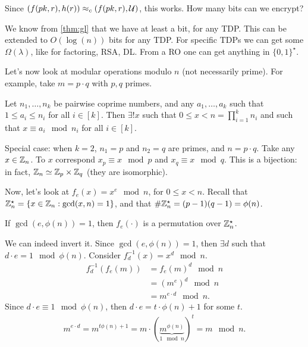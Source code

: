 Since $(f(pk, r), h(r)) \approx_c  (f(pk, r), \mathcal{U})$, this works.
How many bits can we encrypt?

We know from \cref{thm:gl} that we have at least a bit, for any \ac{TDP}.
This can be extended to $O(\log(n))$ bits for any \ac{TDP}.
For specific \acp{TDP} we can get some $\Omega(\lambda)$, like for factoring, \ac{RSA}, \ac{DL}.
From a \ac{RO} one can get anything in $\{0,1\}^{\star}$.

Let's now look at modular operations modulo $n$ (not necessarily prime).
For example, take $m = p \cdot q$ with $p,q$ primes.

\begin{theorem} \label{thm:crt}
	Let $n_1, \dots, n_k$ be pairwise coprime numbers, and any $a_1, \dots, a_k$ such that $1 \le a_i \le n_i$ for all $i \in [k]$.
	Then $\exists ! x$ such that $0 \le x < n = \prod_{i=1}^{k} n_i$ and such that $x \equiv a_i \mod n_i$ for all $i \in [k]$.
\end{theorem}

Special case: when $k = 2$, $n_1 = p$ and $n_2 = q$ are primes, and $n = p \cdot q$.
Take any $x \in \mathbb{Z}_n$.
To $x$ correspond $x_p \equiv x \mod p$ and $x_q \equiv x \mod q$.
This is a bijection: in fact, $\mathbb{Z}_n \simeq \mathbb{Z}_p \times \mathbb{Z}_q$ (\ie they are isomorphic).

Now, let's look at $f_e(x) = x^e \mod n$, for $0 \le x < n$.
Recall that $\mathbb{Z}_n^{\star} = \{ x \in \mathbb{Z}_n : \gcd(x, n) = 1 \}$, and that $\# \mathbb{Z}_n^{\star} = (p-1)(q-1) = \phi(n)$.
\begin{fact}
	If $\gcd(e, \phi(n)) = 1$, then $f_e(\cdot)$ is a permutation over $\mathbb{Z}_n^{\star}$.
\end{fact}
We can indeed invert it.
Since $\gcd(e, \phi(n)) = 1$, then $\exists d$ such that $d \cdot e = 1 \mod \phi(n)$.
Consider $f_d^{-1}(x) = x^d \mod n$.
\begin{align*}
	f_d^{-1} \left( f_e(m) \right)
	& = {f_e(m)}^d \mod n \\
	& = \left(m^e\right)^d \mod n \\
	& = m^{e \cdot d} \mod n.
\end{align*}
Since $d \cdot e \equiv 1 \mod \phi(n)$, then $d \cdot e = t \cdot \phi(n) + 1$ for some $t$.
\begin{align*}
	m^{e \cdot d} =
	m^{t \phi(n) + 1} = m \cdot (\underbrace{m^{\phi(n)}}_{1 \mod n})^t = m \mod n.
\end{align*}

